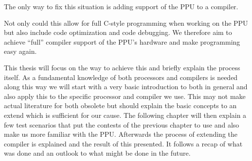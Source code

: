 The only way to fix this situation is adding support of the PPU to a compiler.

Not only could this allow for full C-style programming when working on the PPU but also include code optimization and code debugging.
We therefore aim to achieve ``full'' compiler support of the PPU's hardware and make programming easy again.

This thesis will focus on the way to achieve this and briefly explain the process itself.
As a fundamental knowledge of both processors and compilers is needed along this way we will start with a very basic introduction to both in general and also apply this to the specific processor and compiler we use.
This may not make actual literature for both obsolete but should explain the basic concepts to an extend which is sufficient for our cause.
The following chapter will then explain a few test scenarios that put the contests of the previous chapter to use and also make us more familiar with the PPU.
Afterwards the process of extending the compiler is explained and the result of this presented.
It follows a recap of what was done and an outlook to what might be done in the future.

